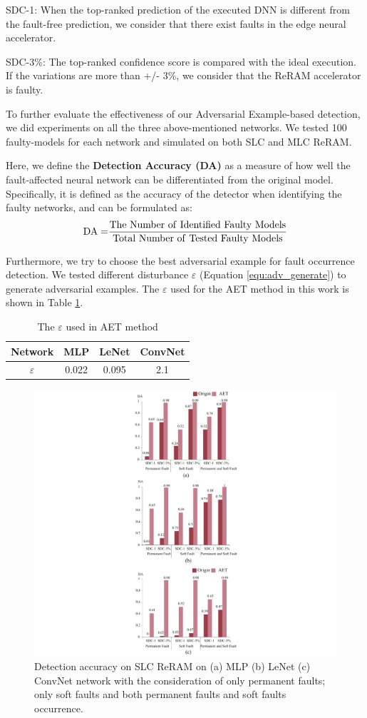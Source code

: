 SDC-1: When the top-ranked prediction of the executed DNN is different from the fault-free prediction, we consider that there exist faults in the edge neural accelerator. 

SDC-3\%: The top-ranked confidence score is compared with the ideal execution. If the variations are more than +/- 3\%, we consider that the ReRAM accelerator is faulty.  

To further evaluate the effectiveness of our Adversarial Example-based detection, we did experiments on all the three above-mentioned networks. We tested 100 faulty-models for each network and simulated on both SLC and MLC ReRAM.

Here, we define the {\bf Detection Accuracy (DA)} as a measure of how well the fault-affected neural network can be differentiated from the original model. Specifically, it is defined as the accuracy of the detector when identifying the faulty networks, and can be formulated as:
\begin{equation}
    {\rm{DA = }}\frac{{{\rm{The\ Number\ of\ Identified\ Faulty\ Models}}}}{{{\rm{Total\ Number\ of\ Tested\ Faulty\  Models}}}}
\end{equation}


Furthermore, we try to choose the best adversarial example for fault occurrence detection.  We tested different disturbance $\varepsilon$ (Equation \ref{equ:adv_generate})  to generate adversarial examples. The  $\varepsilon$ used for the AET method in this work is shown in Table \ref{tab:disturbance}.
\begin{table}
    \centering
    \setlength{\tabcolsep}{2mm}
    \caption{The $\varepsilon$ used in AET method}
    \label{tab:disturbance}
    \begin{tabular}{@{}cccc}
        \toprule
        Network  &  MLP  &  LeNet   &  ConvNet  \\
        \midrule
        $\varepsilon$&0.022&0.095&2.1\\
        \bottomrule
    \end{tabular}
\end{table}


\begin{figure}
    \centering
    \includegraphics[width=0.5\linewidth]{images/OL-fig10}
    \caption{Detection accuracy on SLC ReRAM on (a) MLP (b) LeNet (c) ConvNet network with the consideration of only permanent faults; only soft faults and both permanent faults and soft faults occurrence.}
    \label{fig:mnist-slc}
\end{figure}


